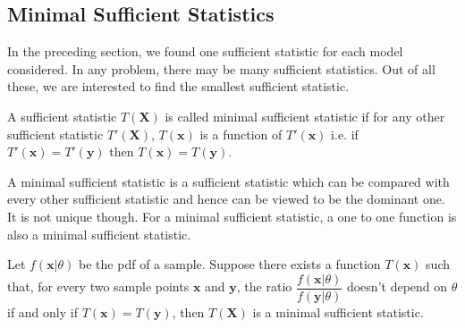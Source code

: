 \documentclass[a4paper,english,12pt]{article}
\newcommand{\bx}{\mathbf{x}}
\newcommand{\by}{\mathbf{y}}
\newcommand{\bX}{\mathbf{X}}
\begin{document}
\subsection{Minimal Sufficient Statistics}
In the preceding section, we found one sufficient statistic for each model considered. In any problem, there may be many sufficient statistics. Out of all these, we are interested to find the smallest sufficient statistic.
\begin{defn}
A sufficient statistic $T(\bX)$ is called minimal sufficient statistic if for any other sufficient statistic $T'(\bX)$, $T(\bx)$ is a function of $T'(\bx)$ i.e. if $T'(\bx)=T'(\by)$ then $T(\bx)=T(\by)$.
 \end{defn}
A minimal sufficient statistic is a sufficient statistic which can be compared with every other sufficient statistic and hence can be viewed to be the dominant one. It is not unique though. For a minimal sufficient statistic, a one to one function is also a minimal sufficient statistic. 
\begin{thm} \label {thm:find_mss}
Let $f(\bx|\theta)$ be the pdf of a sample. Suppose there exists a function $T(\bx)$ such that, for every two sample points $\bx$ and $\by$, the ratio $\dfrac{f(\bx|\theta)}{f(\by|\theta)}$ doesn't depend on $\theta$ if and only if $T(\bx) = T(\by)$, then $T(\bX)$ is a minimal sufficient statistic.
\end{thm}
\end{document}
